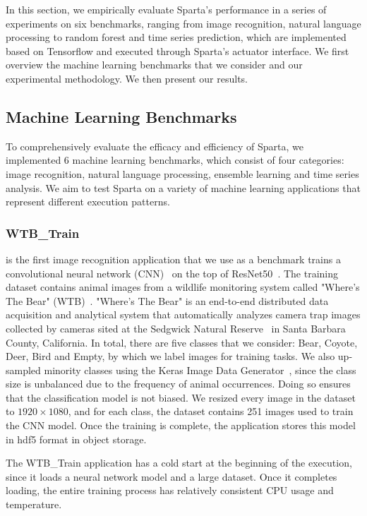 In this section, we empirically evaluate Sparta's performance in a series of experiments on six benchmarks, ranging from image recognition, natural language processing to random forest and time series prediction, which are implemented based on Tensorflow and executed through Sparta's actuator interface. We first overview the machine learning benchmarks that we consider and our experimental methodology. We then present our results.

\subsection{Machine Learning Benchmarks}

To comprehensively evaluate the efficacy and efficiency of Sparta, we implemented 6 machine learning benchmarks, which consist of four categories: image recognition, natural language processing, ensemble learning and time series analysis. We aim to test Sparta on a variety of machine learning applications that represent different execution patterns.

\subsubsection{WTB\_Train}

is the first image recognition application that we use as a benchmark trains a convolutional neural network (CNN)~\cite{ref:cnn} on the top of ResNet50~\cite{ref:resnet}. The training dataset contains animal images from a wildlife monitoring system called "Where's The Bear" (WTB)~\cite{ref:wtb}. "Where's The Bear" is an end-to-end distributed data acquisition and analytical system that automatically analyzes camera trap images collected by cameras sited at the Sedgwick Natural Reserve~\cite{ref:sedgwick} in Santa Barbara County, California. In total, there are five classes that we consider: Bear, Coyote, Deer, Bird and Empty, by which we label images for training tasks. We also up-sampled minority classes using the Keras Image Data Generator~\cite{ref:datagen}, since the class size is unbalanced due to the frequency of animal occurrences. Doing so ensures that the classification model is not biased. We resized every image in the dataset to $1920 \times 1080$, and for each class, the dataset contains 251 images used to train the CNN model. Once the training is complete, the application stores this model in hdf5 format in object storage. 

The WTB\_Train application has a cold start at the beginning of the execution, since it loads a neural network model and a large dataset. Once it completes loading, the entire training process has relatively consistent CPU usage and temperature. 

